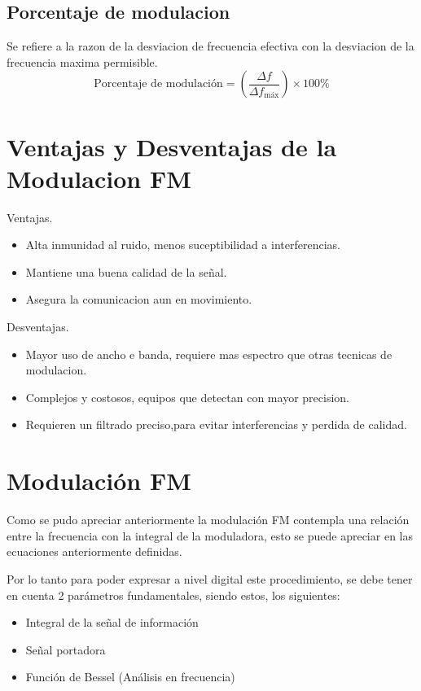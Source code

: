 \documentclass[conference]{IEEEtran}
\begin{document}
	\subsection{Porcentaje de modulacion}
	Se refiere a la razon de la desviacion  de frecuencia  efectiva con la  desviacion de la frecuencia  maxima permisible.
	\[
	\text{Porcentaje de modulación} = \left( \frac{\Delta f}{\Delta f_{\text{máx}}} \right) \times 100\%
	\]
	
	\section{Ventajas y Desventajas de la Modulacion FM}
	Ventajas.
	\begin{itemize}
		\item Alta inmunidad al ruido, menos suceptibilidad a interferencias.
		\item Mantiene una buena calidad de la señal.
		\item Asegura la comunicacion aun en movimiento. 
	\end{itemize}
	Desventajas.
	\begin{itemize}
		\item Mayor  uso de ancho e banda,  requiere mas espectro  que otras tecnicas de modulacion.
		\item Complejos y costosos, equipos que detectan con mayor precision.
		\item Requieren un filtrado preciso,para evitar interferencias y perdida de calidad.
	\end{itemize}
	
	\section{Modulación FM}
	
	Como se pudo apreciar anteriormente la modulación FM contempla una relación entre la frecuencia con la integral de la moduladora, esto se puede apreciar en las ecuaciones anteriormente definidas.
	
	Por lo tanto para poder expresar a nivel digital este procedimiento, se debe tener en cuenta 2 parámetros fundamentales, siendo estos, los siguientes:
	
	\begin{itemize}
		\item Integral de la señal de información
		\item Señal portadora
		\item Función de Bessel (Análisis en frecuencia)
	\end{itemize}
	
\end{document}

